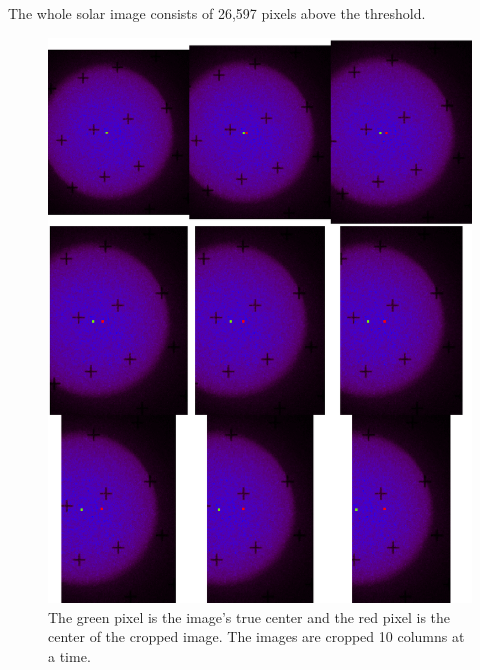 \documentclass[10pt]{scrartcl}
\begin{document}
The whole solar image consists of 26,597 pixels above the threshold.
\begin{figure}[!ht]
    \centering
    \includegraphics[width=.9\textwidth]{../plots_tables_images/cutofftestside.eps}    
    \caption{The green pixel is the image's true center and the red pixel is the center of the cropped image. The images are cropped 10 columns at a time.}
    \label{crop9side}
\end{figure}
\end{document}
